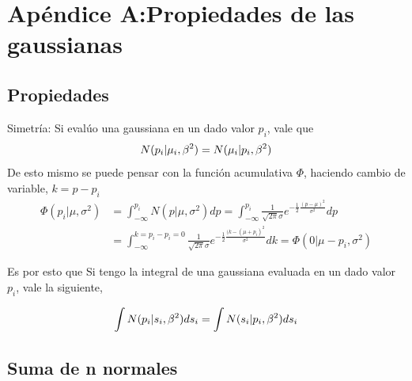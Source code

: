 \documentclass[11pt,twoside,spanish]{report} %
\begin{document}



\appendix
\chapter{Ap\'endice A:Propiedades de las gaussianas}
%
\label{appendix:gauss}


\section{Propiedades}

Simetr\'ia:  Si eval\'uo una gaussiana en un dado valor $p_i$, vale que
\begin{equation}
	\centering
	N(p_i \vert \mu_i,\beta^2) =  N(\mu_i \vert p_i,\beta^2)
\end{equation}
De esto mismo se puede pensar con la funci\'on acumulativa $\Phi$, haciendo cambio de variable, $k=p-p_i$
\begin{equation}
	\begin{split}
		\Phi(p_i \vert \mu,\sigma^2) &= \int_{-\infty}^{p_i} N(p \vert \mu,\sigma^2) dp = \int_{-\infty}^{p_i} \frac{1}{\sqrt{2\pi}\sigma}e^{-\frac{1}{2}\frac{(p-\mu)^2}{\sigma^2}} dp\\
		& = \int_{-\infty}^{k=p_i-p_i=0} \frac{1}{\sqrt{2\pi}\sigma}e^{-\frac{1}{2}\frac{(k-(\mu+p_i)^2}{\sigma^2}}dk= \Phi(0 \vert \mu-p_i,\sigma^2)
	\end{split}
\end{equation}

Es por esto que Si tengo la integral de una gaussiana evaluada en un dado valor $p_i$, vale la siguiente,

\begin{equation}
	\centering
	\int N(p_i \vert s_i,\beta^2) ds_i =  \int N(s_i \vert p_i,\beta^2)ds_i
\end{equation}

\section{Suma de n normales}\label{suma_normales_induccion}
\end{document}
